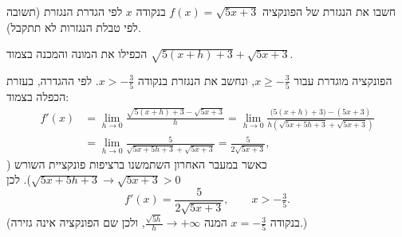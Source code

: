 
\begin{question}
חשבו את הנגזרת של הפונקציה $f(x)=\sqrt{5x+3}$ בנקודה $x$ לפי הגדרת הנגזרת (תשובה לפי טבלת הנגזרות לא תתקבל).
\end{question}

\begin{hint}
הכפילו את המונה והמכנה בצמוד $\sqrt{5(x+h)+3}+\sqrt{5x+3}$.
\end{hint}

\begin{solution}
הפונקציה מוגדרת עבור $x\ge -\tfrac35$, ונחשב את הנגזרת בנקודה $x>-\tfrac35$. לפי ההגדרה, בעזרת הכפלה בצמוד:
\begin{align*}
f'(x)&=\lim_{h\to0}\frac{\sqrt{5(x+h)+3}-\sqrt{5x+3}}{h}
=\lim_{h\to0}\frac{\big(5(x+h)+3\big)-(5x+3)}{h\left(\sqrt{5x+5h+3}+\sqrt{5x+3}\right)}\\
&=\lim_{h\to0}\frac{5}{\sqrt{5x+5h+3}+\sqrt{5x+3}}=\frac{5}{2\sqrt{5x+3}},
\end{align*}
כאשר במעבר האחרון השתמשנו ברציפות פונקציית השורש ($\sqrt{5x+5h+3}\to\sqrt{5x+3}>0$). לכן
\[ f'(x)=\frac{5}{2\sqrt{5x+3}},\qquad x>-\tfrac35. \]
(בנקודה $x=-\tfrac35$ המנה $\frac{\sqrt{5h}}{h}\to+\infty$, ולכן שם הפונקציה אינה גזירה.)
\end{solution}
